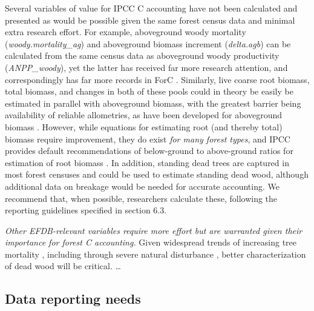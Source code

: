 \documentclass[, manuscript]{copernicus}
\begin{document}
Several variables of value for IPCC C accounting have not been
calculated and presented as would be possible given the same forest
census data and minimal extra research effort. For example, aboveground
woody mortality (\emph{woody.mortality\_ag}) and aboveground biomass
increment (\emph{delta.agb}) can be calculated from the same census data
as aboveground woody productivity (\emph{ANPP\_woody}), yet the latter
has received far more research attention, and correspondingly has far
more records in ForC \citetext{\citealp[Table
2,][]{anderson-teixeira_carbon_2021}; \citealp[but
see][]{piponiot_distribution_2022}}. Similarly, live coarse root
biomass, total biomass, and changes in both of these pools could in
theory be easily be estimated in parallel with aboveground biomass, with
the greatest barrier being availability of reliable allometries, as have
been developed for aboveground biomass
\citep{chave_improved_2014, rejou-mechain_biomass_2017, gonzalez-akre_allodb_2022}.
However, while equations for estimating root (and thereby total) biomass
require improvement, they do exist \emph{for many forest
types}\citep{refs}, and IPCC provides default recommendations of
below-ground to above-ground ratios for estimation of root biomass
\citep{ipcc_2019_2019}. In addition, standing dead trees are captured in
most forest censuses and could be used to estimate standing dead wood,
although additional data on breakage would be needed for accurate
accounting. We recommend that, when possible, researchers calculate
these, following the reporting guidelines specified in section 6.3.

\emph{Other EFDB-relevant variables require more effort but are
warranted given their importance for forest C accounting.} Given
widespread trends of increasing tree mortality \citep{refs}, including
through severe natural disturbance \citep{refs}, better characterization
of dead wood will be critical. \ldots{}

\subsection{Data reporting needs}
\end{document}
